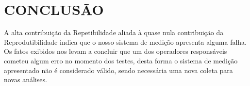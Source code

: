 \chapter{CONCLUSÃO}
\label{chap:conclusion}

A alta contribuição da Repetibilidade aliada à quase nula contribuição da Reprodutibilidade indica que o nosso sistema de medição apresenta alguma falha. Os fatos exibidos nos levam a concluir que um dos operadores responsáveis cometeu algum erro no momento dos testes, desta forma o sistema de medição apresentado não é considerado válido, sendo necessária uma nova coleta para novas análises.